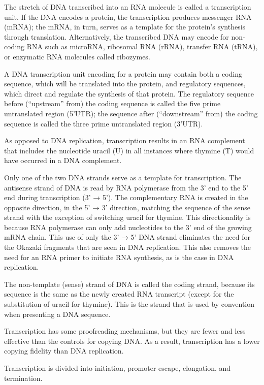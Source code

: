 The stretch of DNA transcribed into an RNA molecule is called a transcription unit. If the DNA encodes a protein, the transcription produces messenger RNA (mRNA); the mRNA, in turn, serves as a template for the protein's synthesis through translation. Alternatively, the transcribed DNA may encode for non-coding RNA such as microRNA, ribosomal RNA (rRNA), transfer RNA (tRNA), or enzymatic RNA molecules called ribozymes.

A DNA transcription unit encoding for a protein may contain both a coding sequence, which will be translated into the protein, and regulatory sequences, which direct and regulate the synthesis of that protein. The regulatory sequence before (``upstream'' from) the coding sequence is called the five prime untranslated region (5'UTR); the sequence after (``downstream'' from) the coding sequence is called the three prime untranslated region (3'UTR).

As opposed to DNA replication, transcription results in an RNA complement that includes the nucleotide uracil (U) in all instances where thymine (T) would have occurred in a DNA complement.

Only one of the two DNA strands serve as a template for transcription. The antisense strand of DNA is read by RNA polymerase from the 3' end to the 5' end during transcription (3' → 5'). The complementary RNA is created in the opposite direction, in the 5' → 3' direction, matching the sequence of the sense strand with the exception of switching uracil for thymine. This directionality is because RNA polymerase can only add nucleotides to the 3' end of the growing mRNA chain. This use of only the 3' → 5' DNA strand eliminates the need for the Okazaki fragments that are seen in DNA replication. This also removes the need for an RNA primer to initiate RNA synthesis, as is the case in DNA replication.

The non-template (sense) strand of DNA is called the coding strand, because its sequence is the same as the newly created RNA transcript (except for the substitution of uracil for thymine). This is the strand that is used by convention when presenting a DNA sequence.

Transcription has some proofreading mechanisms, but they are fewer and less effective than the controls for copying DNA. As a result, transcription has a lower copying fidelity than DNA replication.

Transcription is divided into initiation, promoter escape, elongation, and termination.

